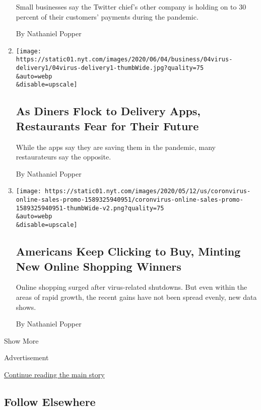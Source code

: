 \begin{enumerate}
  Small businesses say the Twitter chief's other company is holding on
  to 30 percent of their customers' payments during the pandemic.

  By Nathaniel Popper
\item
  \href{/2020/06/09/technology/delivery-apps-restaurants-fees-virus.html}{}

  \texttt{[image: https://static01.nyt.com/images/2020/06/04/business/04virus-delivery1/04virus-delivery1-thumbWide.jpg?quality=75\\\&auto=webp\\\&disable=upscale]}

  \hypertarget{as-diners-flock-to-delivery-apps-restaurants-fear-for-their-future}{%
  \subsection{As Diners Flock to Delivery Apps, Restaurants Fear for
  Their
  Future}\label{as-diners-flock-to-delivery-apps-restaurants-fear-for-their-future}}

  While the apps say they are saving them in the pandemic, many
  restaurateurs say the opposite.

  By Nathaniel Popper
\item
  \href{/interactive/2020/05/13/technology/online-shopping-buying-sales-coronavirus.html}{}

  \texttt{[image: https://static01.nyt.com/images/2020/05/12/us/coronvirus-online-sales-promo-1589325940951/coronvirus-online-sales-promo-1589325940951-thumbWide-v2.png?quality=75\\\&auto=webp\\\&disable=upscale]}

  \hypertarget{americans-keep-clicking-to-buy-minting-new-online-shopping-winners}{%
  \subsection{Americans Keep Clicking to Buy, Minting New Online
  Shopping
  Winners}\label{americans-keep-clicking-to-buy-minting-new-online-shopping-winners}}

  Online shopping surged after virus-related shutdowns. But even within
  the areas of rapid growth, the recent gains have not been spread
  evenly, new data shows.

  By Nathaniel Popper
\end{enumerate}

Show More

Advertisement

\protect\hyperlink{after-mid2}{Continue reading the main story}

\hypertarget{follow-elsewhere}{%
\subsection{Follow Elsewhere}\label{follow-elsewhere}}

